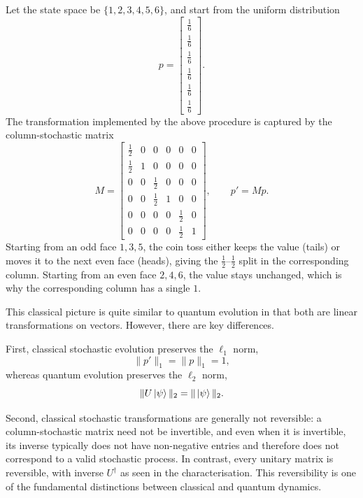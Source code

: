 Let the state space be $\{1,2,3,4,5,6\}$, and start from the uniform distribution
\[
p=
\begin{bmatrix}
\frac16\\
\frac16\\
\frac16\\
\frac16\\
\frac16\\
\frac16
\end{bmatrix}.
\]
The transformation implemented by the above procedure is captured by the column-stochastic matrix
\[
M=
\begin{bmatrix}
\frac12 & 0 & 0 & 0 & 0 & 0\\
\frac12 & 1 & 0 & 0 & 0 & 0\\
0 & 0 & \frac12 & 0 & 0 & 0\\
0 & 0 & \frac12 & 1 & 0 & 0\\
0 & 0 & 0 & 0 & \frac12 & 0\\
0 & 0 & 0 & 0 & \frac12 & 1
\end{bmatrix},
\qquad
p' = Mp.
\]
Starting from an odd face $1,3,5$, the coin toss either keeps the value (tails) or moves it to the next even face (heads), giving the $\frac12$--$\frac12$ split in the corresponding column. Starting from an even face $2,4,6$, the value stays unchanged, which is why the corresponding column has a single $1$.

This classical picture is quite similar to quantum evolution in that both are linear transformations on vectors. However, there are key differences.

First, classical stochastic evolution preserves the $\ell_1$ norm,
\[
\|p'\|_1 = \|p\|_1 = 1,
\]
whereas quantum evolution preserves the $\ell_2$ norm,
\[
\|U\ket{\psi}\|_2 = \|\ket{\psi}\|_2.
\]

Second, classical stochastic transformations are generally not reversible: a column-stochastic matrix need not be invertible, and even when it is invertible, its inverse typically does not have non-negative entries and therefore does not correspond to a valid stochastic process. In contrast, every unitary matrix is reversible, with inverse $U^\dagger$ as seen in the characterisation. This reversibility is one of the fundamental distinctions between classical and quantum dynamics.




